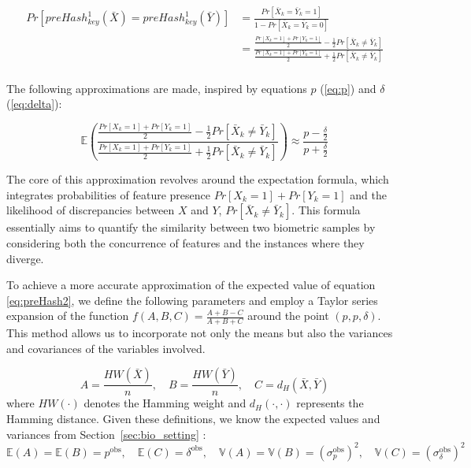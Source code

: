 \begin{equation} \label{eq:preHash2}
    \begin{aligned}
        Pr[preHash_{key}^1(\bar{X}) = preHash_{key}^1(\bar{Y})] &= \frac{Pr[\bar{X}_k = \bar{Y}_k = 1]}{1 - Pr[\bar{X}_k = \bar{Y}_k = 0]}\\
        &= \frac{\frac{Pr[X_k = 1] + Pr[Y_k = 1]}{2} - \frac{1}{2}Pr[\bar{X}_k \neq \bar{Y}_k]}{\frac{Pr[X_k = 1] + Pr[Y_k = 1]}{2} + \frac{1}{2}Pr[\bar{X}_k \neq \bar{Y}_k]}\\
    \end{aligned}
\end{equation}

The following approximations are made, inspired by equations \(p\) (\ref{eq:p}) and $\delta$ (\ref{eq:delta}):

\begin{equation}
    \mathbb{E}\left(\frac{\frac{Pr[X_k = 1] + Pr[Y_k = 1]}{2} - \frac{1}{2}Pr[\bar{X}_k \neq \bar{Y}_k]}{\frac{Pr[X_k = 1] + Pr[Y_k = 1]}{2} + \frac{1}{2}Pr[\bar{X}_k \neq \bar{Y}_k]}\right) \approx \frac{p - \frac{\delta}{2}}{p + \frac{\delta}{2}}
\end{equation}

The core of this approximation revolves around the expectation formula, which integrates probabilities of feature presence \(Pr[X_k=1]+Pr[Y_k=1]\) and the likelihood of discrepancies between \(X\) and \(Y\), \(Pr[\bar{X}_k \neq \bar{Y}_k]\). This formula essentially aims to quantify the similarity between two biometric samples by considering both the concurrence of features and the instances where they diverge.

To achieve a more accurate approximation of the expected value of equation \ref{eq:preHash2}, we define the following parameters and employ a Taylor series expansion of the function \(f(A,B,C) = \frac{A + B - C}{A + B + C}\) around the point \((p, p, \delta)\). This method allows us to incorporate not only the means but also the variances and covariances of the variables involved.

\[
A = \frac{HW(\bar{X})}{n}, \quad B = \frac{HW(\bar{Y})}{n}, \quad C = d_H(\bar{X}, \bar{Y})
\]
where \(HW(\cdot)\) denotes the Hamming weight and \(d_H(\cdot, \cdot)\) represents the Hamming distance. Given these definitions, we know the expected values and variances from Section~\ref{sec:bio_setting} :
\[
    \mathbb{E}(A) = \mathbb{E}(B) = p^\text{obs}, \quad \mathbb{E}(C) = \delta^\text{obs}, \quad \mathbb{V}(A) = \mathbb{V}(B) = ({\sigma^\text{obs}_p})^2, \quad \mathbb{V}(C) = ({\sigma^\text{obs}_\delta})^2
\]

